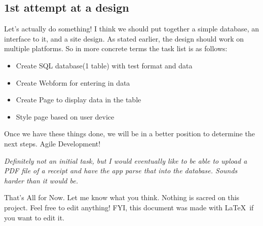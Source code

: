 \documentclass[a4paper,12pt]{article}
\begin{document}
\subsection{1st attempt at a design}
Let's actually do something! I think we should put together a simple database, an interface to it, and a site design. As stated earlier, the design should work on multiple platforms. So in more concrete terms the task list is as follows:
\begin{itemize}
  \item Create SQL database(1 table) with test format and data
  \item Create Webform for entering in data
  \item Create Page to display data in the table
  \item Style page based on user device
\end{itemize}

Once we have these things done, we will be in a better position to determine the next steps. Agile Development!

\textit{Definitely not an initial task, but I would eventually like to be able to upload a PDF file of a receipt and have the app parse that into the database. Sounds harder than it would be.}


That's All for Now. Let me know what you think. Nothing is sacred on this project. Feel free to edit anything! FYI, this document was made with \LaTeX\ if you want to edit it.
\end{document}
